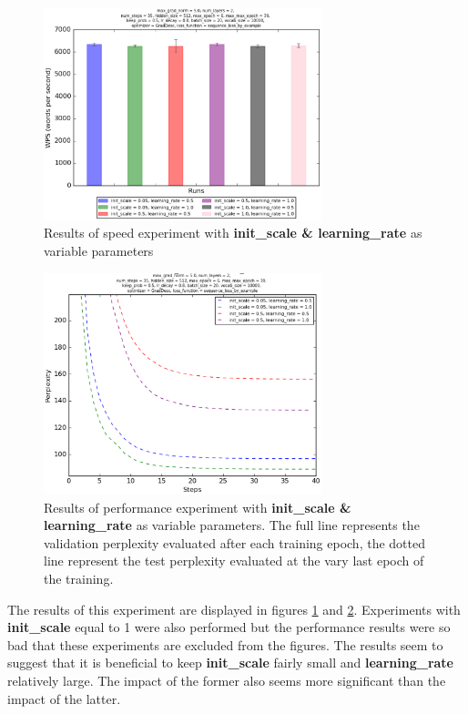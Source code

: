 \documentclass[10pt,a4paper,titlepage]{article}
\begin{document}
\begin{figure}[H]
	\begin{center}
		\includegraphics[width=0.72\textwidth]{initlearnspeed.eps}
		\caption{Results of speed experiment with \textbf{init\_scale \& learning\_rate} as variable parameters}
		\label{fig:exp2speed}
	\end{center}	
\end{figure}

\begin{figure}[H]
	\begin{center}
		\includegraphics[width=0.72\textwidth]{initlearnperf.eps}
		\caption{Results of performance experiment with \textbf{init\_scale \& learning\_rate} as variable parameters. The full line represents the validation perplexity evaluated after each training epoch, the dotted line represent the test perplexity evaluated at the vary last epoch of the training.}
		\label{fig:exp2perf}
	\end{center}	
\end{figure}

The results of this experiment are displayed in figures \ref{fig:exp2speed} and \ref{fig:exp2perf}. Experiments with \textbf{init\_scale} equal to 1 were also performed but the performance results were so bad that these experiments are excluded from the figures. The results seem to suggest that it is beneficial to keep \textbf{init\_scale} fairly small and \textbf{learning\_rate} relatively large. The impact of the former also seems more significant than the impact of the latter.
\end{document}
